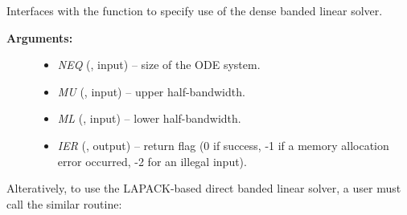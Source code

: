 \documentclass[letterpaper,10pt,english]{sphinxmanual}
\begin{document}
\begin{fulllineitems}
\label{f_interface/Usage:f/_/FARKMASSBAND}
Interfaces with the {\hyperref[c_interface/User_callable:c.ARKMassBand]{\emph{}}} function to
specify use of the dense banded linear solver.
\begin{description}
\item[{\textbf{Arguments:}}] \leavevmode\begin{itemize}
\item {} 
\emph{NEQ} (, input) -- size of the ODE system.

\item {} 
\emph{MU} (, input) -- upper half-bandwidth.

\item {} 
\emph{ML} (, input) -- lower half-bandwidth.

\item {} 
\emph{IER} (, output) -- return flag (0 if success, -1 if a memory allocation
error occurred, -2 for an illegal input).

\end{itemize}

\end{description}

\end{fulllineitems}


Alteratively, to use the LAPACK-based direct banded linear solver, a
user must call the similar {\hyperref[f_interface/Usage:f/_/FARKMASSLAPACKBAND]{\emph{}}} routine:
\end{document}
